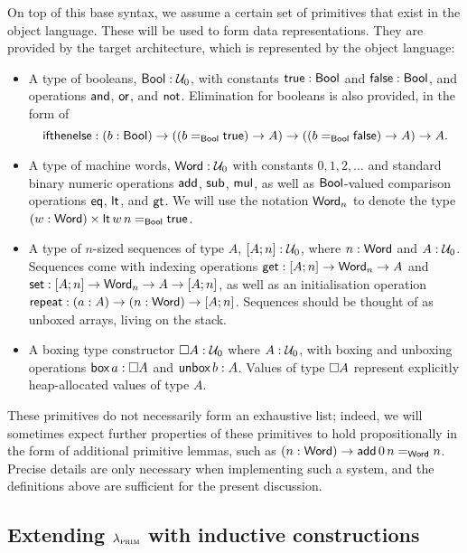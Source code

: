 On top of this base syntax, we assume a certain set of primitives that exist in
the object language. These will be used to form data representations. They are
provided by the target architecture, which is represented by the object
language:
\begin{itemize}
  \item A type of booleans, $\inte{Bool} : \univ_0$, with constants $\inte{true} :
          \inte{Bool}$ and $\inte{false} : \inte{Bool}$, and operations $\inte{and}$,
        $\inte{or}$, and $\inte{not}$. Elimination for booleans is also provided, in
        the form of \[\inte{ifthenelse} : (b : \inte{Bool}) \to ((\Id{\inte{Bool}}{b}{\inte{true}}) \to A)
          \to ((\Id{\inte{Bool}}{b}{\inte{false}}) \to A) \to A.\]
  \item A type of machine words, $\inte{Word} : \univ_0$ with constants $0, 1, 2,
          \ldots$ and standard binary numeric operations $\inte{add}$, $\inte{sub}$,
        $\inte{mul}$, as well as $\inte{Bool}$-valued comparison operations
        $\inte{eq}$, $\inte{lt}$, and $\inte{gt}$. We will use the notation
        $\inte{Word}_n$ to denote the type $(w : \inte{Word}) \times
          \Id{\inte{Bool}}{\inte{lt} \, w \, n}{\inte{true}}$.
  \item A type of $n$-sized sequences of type $A$, $\seq{A}{n} : \univ_0$, where $n :
          \inte{Word}$ and $A : \univ_0$. Sequences come with indexing operations
        $\inte{get} : \seq{A}{n} \to \inte{Word}_n \to A$ and $\inte{set} : \seq{A}{n}
          \to \inte{Word}_n \to A \to \seq{A}{n}$, as well as an initialisation operation
        $\inte{repeat} : (a : A) \to (n : \inte{Word}) \to \seq{A}{n}$. Sequences
        should be thought of as unboxed arrays, living on the stack.
  \item A boxing type constructor $\boxx A : \univ_0$ where $A : \univ_0$, with boxing
        and unboxing operations $\inbox a : \boxx A$ and $\unbox b : A$. Values of type
        $\boxx A$ represent explicitly heap-allocated values of type $A$.
\end{itemize}
These primitives do not necessarily form an exhaustive list; indeed, we will
sometimes expect further properties of these primitives to hold propositionally
in the form of additional primitive lemmas, such as
$(n : \inte{Word}) \to \Id{\inte{Word}}{\inte{add}\,0\,n}{n}$. Precise details are only necessary when
implementing such a system, and the definitions above are sufficient for the
present discussion.

\subsection{Extending $\lambdaprim$ with inductive constructions}\label{sub:lambdaind}

